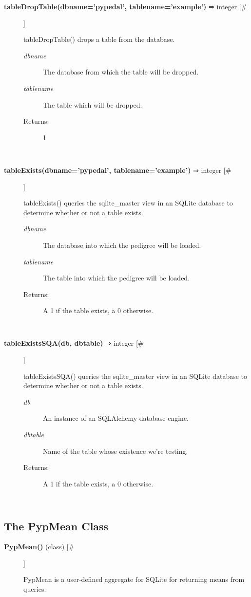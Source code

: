 \begin{description}
\item[\textbf{tableDropTable(dbname='pypedal', tablename='example')} ⇒ integer [\#]
]
\par tableDropTable() drops a table from the database.
\begin{description}
\item[\textit{dbname}
]
The database from which the table will be dropped.
\item[\textit{tablename}
]
The table which will be dropped.
\item[Returns:
]
1
\end{description}\\

\item[\textbf{tableExists(dbname='pypedal', tablename='example')} ⇒ integer [\#]
]
\par tableExists() queries the sqlite\_master view in an SQLite database to
determine whether or not a table exists.
\begin{description}
\item[\textit{dbname}
]
The database into which the pedigree will be loaded.
\item[\textit{tablename}
]
The table into which the pedigree will be loaded.
\item[Returns:
]
A 1 if the table exists, a 0 otherwise.
\end{description}\\

\item[\textbf{tableExistsSQA(db, dbtable)} ⇒ integer [\#]
]
\par tableExistsSQA() queries the sqlite\_master view in an SQLite database to
determine whether or not a table exists.
\begin{description}
\item[\textit{db}
]
An instance of an SQLAlchemy database engine.
\item[\textit{dbtable}
]
Name of the table whose existence we're testing.
\item[Returns:
]
A 1 if the table exists, a 0 otherwise.
\end{description}\\

\end{description}
\subsection*{The PypMean Class}
\begin{description}
\item[\textbf{PypMean()} (class) [\#]
]
\par PypMean is a user-defined aggregate for SQLite for returning means from queries.

\end{description}
